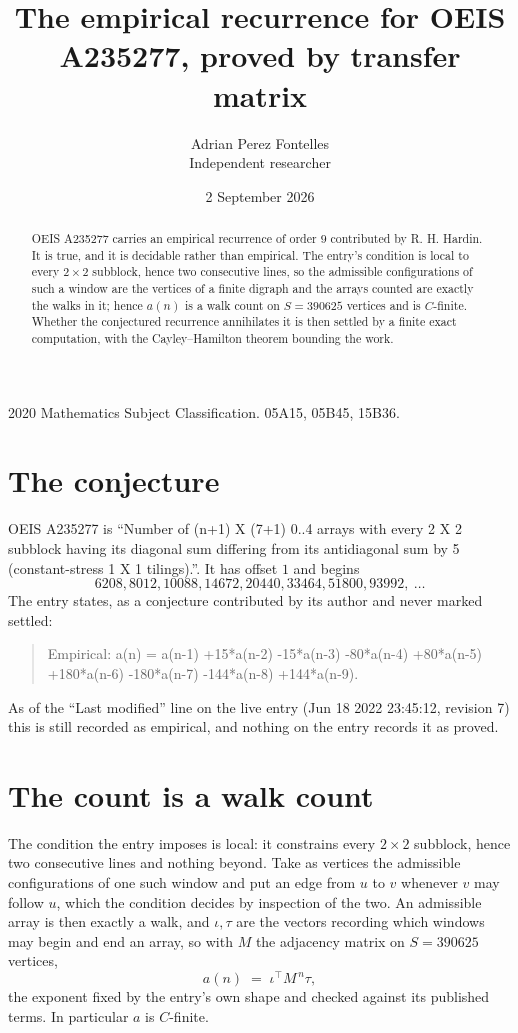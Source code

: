 \documentclass[11pt,a4paper]{article}
\title{The empirical recurrence for OEIS A235277, proved by transfer matrix}
\author{Adrian Perez Fontelles\\ \small Independent researcher}
\date{2 September 2026}
\theoremstyle{plain}
\theoremstyle{definition}
\begin{document}
\maketitle

\begin{abstract}
OEIS A235277 carries an empirical recurrence of order $9$ contributed by R. H. Hardin. It is
true, and it is decidable rather than empirical. The entry's condition is local to every $2\times2$ subblock, hence two consecutive lines, so
the admissible configurations of such a window are the vertices of a finite digraph and the
arrays counted are exactly the walks in it; hence $a(n)$ is a walk count on $S=390625$ vertices
and is $C$-finite. Whether the conjectured recurrence annihilates it is then settled by a
finite exact computation, with the Cayley--Hamilton theorem bounding the work.
\end{abstract}

\noindent\small 2020 Mathematics Subject Classification. 05A15, 05B45, 15B36.\normalsize

\section{The conjecture}

OEIS A235277 is ``Number of (n+1) X (7+1) 0..4 arrays with every 2 X 2 subblock having its diagonal sum differing from its antidiagonal sum by 5 (constant-stress 1 X 1 tilings).''. It has offset $1$ and begins
\[
6208, 8012, 10088, 14672, 20440, 33464, 51800, 93992,\ \dots
\]
The entry states, as a conjecture contributed by its author and never marked settled:
\begin{quote}
Empirical: a(n) = a(n-1) +15*a(n-2) -15*a(n-3) -80*a(n-4) +80*a(n-5) +180*a(n-6) -180*a(n-7) -144*a(n-8) +144*a(n-9).
\end{quote}
As of the ``Last modified'' line on the live entry (Jun 18 2022 23:45:12, revision 7) this is still
recorded as empirical, and nothing on the entry records it as proved.

\section{The count is a walk count}

The condition the entry imposes is local: it constrains every $2\times2$ subblock, hence two consecutive lines and nothing beyond. Take as vertices the admissible configurations of one such window and put an edge from $u$ to $v$ whenever $v$ may follow $u$, which the condition decides by inspection of the two.
An admissible array is then exactly a walk, and $\iota,\tau$ are the vectors recording which windows may begin and end an array, so with $M$ the adjacency matrix on $S=390625$ vertices,
\[
a(n)\;=\;\iota^{\!\top}M^{\,n}\tau ,
\]
the exponent fixed by the entry's own shape and checked against its published terms. In
particular $a$ is $C$-finite.
\end{document}
